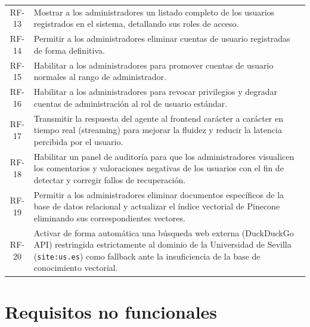 \documentclass[12pt,a4paper,oneside]{report}
\begin{document}
\begin{longtable}{@{}cp{12cm}@{}}
    RF-13       & Mostrar a los administradores un listado completo de los usuarios registrados en el sistema, detallando sus roles de acceso. \\
    RF-14       & Permitir a los administradores eliminar cuentas de usuario registradas de forma definitiva. \\
    RF-15       & Habilitar a los administradores para promover cuentas de usuario normales al rango de administrador. \\
    RF-16       & Habilitar a los administradores para revocar privilegios y degradar cuentas de administración al rol de usuario estándar. \\
    RF-17       & Transmitir la respuesta del agente al frontend carácter a carácter en tiempo real (streaming) para mejorar la fluidez y reducir la latencia percibida por el usuario. \\
    RF-18       & Habilitar un panel de auditoría para que los administradores visualicen los comentarios y valoraciones negativas de los usuarios con el fin de detectar y corregir fallos de recuperación. \\
    RF-19       & Permitir a los administradores eliminar documentos específicos de la base de datos relacional y actualizar el índice vectorial de Pinecone eliminando sus correspondientes vectores. \\
    RF-20       & Activar de forma automática una búsqueda web externa (DuckDuckGo API) restringida estrictamente al dominio de la Universidad de Sevilla (\texttt{site:us.es}) como fallback ante la insuficiencia de la base de conocimiento vectorial. \\
    \bottomrule
\end{longtable}

\section{Requisitos no funcionales}
\end{document}
